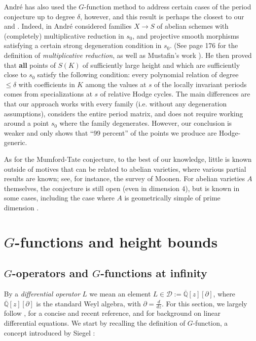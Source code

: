 \documentclass[10pt]{article}
\numberwithin{equation}{section}
\theoremstyle{plain}
\theoremstyle{definition}
\theoremstyle{remark}
\newcommand{\Qbar}{\overline{\mathbb{Q}}}
\begin{document}
André has also used the $G$-function method to address certain cases of the period conjecture up to degree $\delta$, however, and this result is perhaps the closest to our  and . Indeed, in \cite[Ch. IX (page 193)]{zbMATH00041964} Andr\'e considered families $X \to S$ of abelian schemes with (completely) multiplicative reduction in $s_0$, and projective smooth morphisms satisfying a certain strong degeneration condition in $s_0$. (See page 176 for the definition of \emph{multiplicative reduction}, as well as Mustafin's work \cite{zbMATH04029733}). He then proved that \textbf{all} points of $S(K)$ of sufficiently large height and which are sufficiently close to $s_0$ satisfy the following condition: every polynomial relation of degree $\le \delta$ with coefficients in $K$ among the values at $s$ of the locally invariant periods comes from specializations at $s$ of relative Hodge cycles. The main differences are that our approach works with every family (i.e. without any degeneration assumptions), considers the entire period matrix, and does not require working around a point $s_0$ where the family degenerates. However, our conclusion is weaker and only shows that ``99 percent'' of the points we produce are Hodge-generic. 






As for the Mumford-Tate conjecture, to the best of our knowledge, little is known outside of motives that can be related to abelian varieties, where various partial results are known; see, for instance, the survey \cite{Moonen} of Moonen. 
For abelian varieties $A$ themselves, the conjecture is still open (even in dimension $4$), but is known in some cases, including the case where $A$ is geometrically simple of prime dimension \cite{zbMATH03941671}. 



\section{$G$-functions and height bounds}\label{sec3}



\subsection{$G$-operators and $G$-functions at infinity}
\label{Gopsec}


By a \emph{differential operator} $L$ we mean an element $L \in \mathcal{D} := \Qbar[z][\partial]$, where $\Qbar[z][\partial]$ is the standard Weyl algebra, with $\partial = \frac{d}{dz}$. For this section, we largely follow \cite{zbMATH00041964}, \cite[Sec. 1]{zbMATH07441738} for a concise and recent reference, and \cite{zbMATH01860838} for background on linear differential equations. We start by recalling the definition of $G$-function, a concept introduced by Siegel \cite{zbMATH02563202}:
\end{document}
